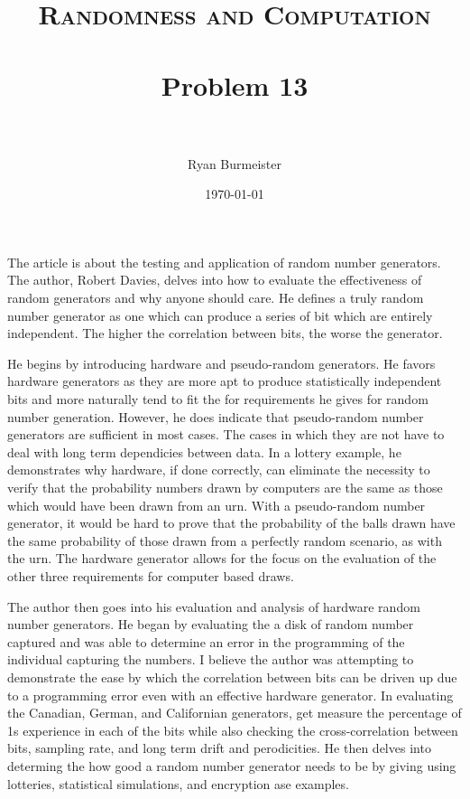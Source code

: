 \documentclass[fontsize=12pt]{article}
\title{ 
  \normalfont \normalsize 
  \textsc{Randomness and Computation} \\ [25pt] %
  \horrule{0.5pt} \\[0.4cm] %
  \huge Problem 13 \\ %
  \horrule{2pt} \\[0.5cm] %
}
\author{Ryan Burmeister} %
\date{\normalsize\today} %
\numberwithin{equation}{section} %
\numberwithin{figure}{section} %
\numberwithin{table}{section} %
\begin{document}
\maketitle %

The article is about the testing and application of random number generators.
The author, Robert Davies, delves into how to evaluate the effectiveness of
random generators and why anyone should care.  He defines a truly random number
generator as one which can produce a series of bit which are entirely
independent.  The higher the correlation between bits, the worse the generator.




\par He begins by introducing hardware and pseudo-random generators.  He favors
hardware generators as they are more apt to produce statistically independent
bits and more naturally tend to fit the for requirements he gives for random
number generation.  However, he does indicate that pseudo-random number
generators are sufficient in most cases.  The cases in which they are not have
to deal with long term dependicies between data.  In a lottery example, he
demonstrates why hardware, if done correctly, can eliminate the necessity to
verify that the probability numbers drawn by computers are the same as those
which would have been drawn from an urn.  With a pseudo-random number
generator, it would be hard to prove that the probability of the balls drawn
have the same probability of those drawn from a perfectly random scenario, as
with the urn.  The hardware generator allows for the focus on the evaluation of
the other three requirements for computer based draws.

\par The author then goes into his evaluation and analysis of hardware random
number generators.  He began by evaluating the a disk of random number captured
and was able to determine an error in the programming of the individual
capturing the numbers.  I believe the author was attempting to demonstrate the
ease by which the correlation between bits can be driven up due to a
programming error even with an effective hardware generator.  In evaluating the
Canadian, German, and Californian generators, get measure the percentage of 1s
experience in each of the bits while also checking the cross-correlation
between bits, sampling rate, and long term drift and perodicities. He then
delves into determing the how good a random number generator needs to be by
giving using lotteries, statistical simulations, and encryption ase examples.
\end{document}
